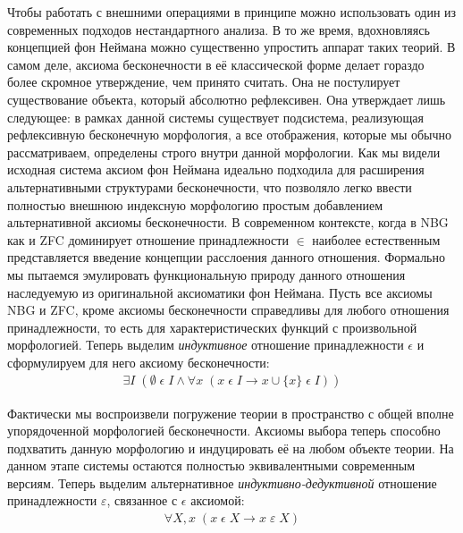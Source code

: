 \documentclass[12pt]{article}
\begin{document}
Чтобы работать с внешними операциями в принципе можно использовать один из современных подходов нестандартного анализа. В то же время, вдохновляясь концепцией фон Неймана можно существенно упростить аппарат таких теорий. В самом деле, аксиома бесконечности в её классической форме делает гораздо более скромное утверждение, чем принято считать. Она не постулирует существование объекта, который абсолютно рефлексивен. Она утверждает лишь следующее: в рамках данной системы существует подсистема, реализующая рефлексивную бесконечную морфология, а все отображения, которые мы обычно рассматриваем, определены строго внутри данной морфологии. Как мы видели исходная система аксиом фон Неймана идеально подходила для расширения альтернативными структурами бесконечности, что позволяло легко ввести полностью внешнюю индексную морфологию простым добавлением альтернативной аксиомы бесконечности. В современном контексте, когда в NBG как и ZFC доминирует отношение принадлежности $\in$ наиболее естественным представляется введение концепции расслоения данного отношения. Формально мы пытаемся эмулировать функциональную природу данного отношения наследуемую из оригинальной аксиоматики фон Неймана. Пусть все аксиомы NBG и ZFC, кроме аксиомы бесконечности справедливы для любого отношения принадлежности, то есть для характеристических функций с произвольной морфологией. Теперь выделим {\it индуктивное} отношение принадлежности $\epsilon$ и сформулируем для него аксиому бесконечности:
\begin{equation}
\begin{gathered}
\exists I \; (\emptyset \; \epsilon \; I \wedge \forall x \; (x \; \epsilon \; I \to x \cup \{ x \} \; \epsilon \; I))
\label{axiom:ordinal-infinity}
\end{gathered}
\end{equation}

Фактически мы воспроизвели погружение теории в пространство с общей вполне упорядоченной морфологией бесконечности. Аксиомы выбора теперь способно подхватить данную морфологию и индуцировать её на любом объекте теории. На данном этапе системы остаются полностью эквивалентными современным версиям. Теперь выделим альтернативное {\it индуктивно-дедуктивной} отношение принадлежности $\varepsilon$, связанное с $\epsilon$ аксиомой:
\begin{equation}
\begin{gathered}
\forall X, x \; (x \; \epsilon \; X \to x \; \varepsilon \; X)
\label{axiom:induction-deduction}
\end{gathered}
\end{equation}
\end{document}
